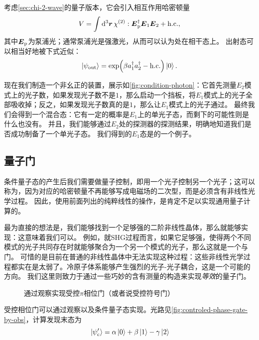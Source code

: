 考虑\autoref{sec:chi-2-wave}的量子版本，它会引入相互作用哈密顿量
\begin{equation}
    V = \int \dd[3]{\vb*{r}} \chi^{(2)} : \vb*{E}_\text{p}^\dagger \vb*{E}_1 \vb*{E}_2 + \text{h.c.},
\end{equation}
其中$\vb*{E}_\text{p}$为泵浦光；通常泵浦光是强激光，从而可以认为处在相干态上。
出射态可以相当好地被下式近似：%
\begin{equation}
    \ket{\psi_\text{out}} = \exp(\beta a_1^\dagger a_2^\dagger - \text{h.c.}) \ket{0}.
\end{equation}

现在我们制造一个非幺正的装置，展示如\autoref{fig:condition-photon}：它首先测量$E_2$模式上的光子数，如果发现光子数不是$1$，那么启动一个挡板，将$E_1$模式上的光子全部吸收掉；反之，如果发现光子数真的是$1$，那么让$E_1$模式上的光子通过。
最终我们会得到一个混合态：它有一定的概率是$E_1$上的单光子态，而剩下的可能性则是什么也没有。
并且，我们能够通过$E_2$处的探测器的探测结果，明确地知道我们是否成功制备了一个单光子态。
我们得到的$E_1$态是的一个例子。

\subsection{量子门}

条件量子态的产生后我们需要做量子控制，即用一个光子控制另一个光子；这可以称为，因为对应的哈密顿量不再能够写成电磁场的二次型，而是必须含有非线性光学过程。
因此，使用前面列出的纯粹线性的操作，是肯定不足以实现通用量子计算的。

最为直接的想法是，我们能够找到一个足够强的二阶非线性晶体，那么就能够实现：这意味着我们可以。
例如，就SHG过程而言，如果它足够强，使得两个不同模式的光子共同存在时就能够聚合为一个另一个模式的光子，那么这就是一个与门。
可惜的是目前在普通的非线性晶体中无法实现这种过程：这些非线性光学过程都实在是太弱了。冷原子体系能够产生强烈的光子-光子耦合，这是一个可能的方向。
我们这里则致力于通过一些巧妙的含有测量的构造来实现\emph{等效}的量子门。

\begin{figure}
    \centering
    
    \caption{通过观察实现受控$\pi$相位门（或者说受控符号门）}
    \label{fig:controled-phase-gate-by-obs}
\end{figure}

受控相位门可以通过观察以及条件量子态实现。光路见\autoref{fig:controled-phase-gate-by-obs}，计算发现末态为
\begin{equation}
    \ket*{\psi_\text{c}'} = \alpha \ket*{0} + \beta \ket*{1} - \gamma \ket*{2}
\end{equation}

